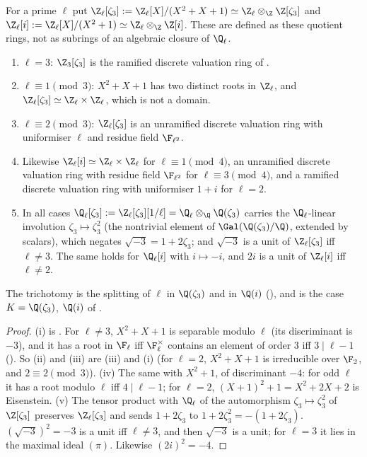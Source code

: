 \begin{proposition}\label{prop:ant:zlzeta3}
For a prime $\ell$ put $\Z_\ell[\zeta_3]:=\Z_\ell[X]/(X^2+X+1)\simeq\Z_\ell\otimes_\Z\Z[\zeta_3]$ and $\Z_\ell[i]:=\Z_\ell[X]/(X^2+1)\simeq\Z_\ell\otimes_\Z\Z[i]$. These are
defined as these quotient rings, not as subrings of an algebraic closure of $\Q_\ell$.
\begin{enumerate}[label=(\roman*)]
\item $\ell=3$: $\Z_3[\zeta_3]$ is the ramified discrete valuation ring of .
\item $\ell\equiv1\pmod3$: $X^2+X+1$ has two distinct roots in $\Z_\ell$, and $\Z_\ell[\zeta_3]\simeq\Z_\ell\times\Z_\ell$, which is not a domain.
\item $\ell\equiv2\pmod3$: $\Z_\ell[\zeta_3]$ is an unramified discrete valuation ring with uniformiser $\ell$ and residue field $\F_{\ell^2}$.
\item Likewise $\Z_\ell[i]\simeq\Z_\ell\times\Z_\ell$ for $\ell\equiv1\pmod4$, an unramified discrete valuation ring with residue field $\F_{\ell^2}$ for
$\ell\equiv3\pmod4$, and a ramified discrete valuation ring with uniformiser $1+i$ for $\ell=2$.
\item In all cases $\Q_\ell[\zeta_3]:=\Z_\ell[\zeta_3][1/\ell]=\Q_\ell\otimes_\Q\Q(\zeta_3)$ carries the $\Q_\ell$-linear involution $\zeta_3\mapsto\zeta_3^2$ (the
nontrivial element of $\Gal(\Q(\zeta_3)/\Q)$, extended by scalars), which negates $\sqrt{-3}=1+2\zeta_3$; and $\sqrt{-3}$ is a unit of $\Z_\ell[\zeta_3]$ iff
$\ell\ne3$. The same holds for $\Q_\ell[i]$ with $i\mapsto-i$, and $2i$ is a unit of $\Z_\ell[i]$ iff $\ell\ne2$.
\end{enumerate}
The trichotomy is the splitting of $\ell$ in $\Q(\zeta_3)$ and in $\Q(i)$ (), and is the case $K=\Q(\zeta_3)$, $\Q(i)$ of
.
\end{proposition}

\begin{proof}
(i) is . For $\ell\ne3$, $X^2+X+1$ is separable modulo $\ell$ (its discriminant is $-3$), and it has a root in $\F_\ell$ iff $\F_\ell^\times$
contains an element of order $3$ iff $3\mid\ell-1$ (). So (ii) and (iii) are (iii) and (i) (for $\ell=2$,
$X^2+X+1$ is irreducible over $\F_2$, and $2\equiv2\pmod 3$). (iv) The same with $X^2+1$, of discriminant $-4$: for odd $\ell$ it has a root modulo $\ell$
iff $4\mid\ell-1$; for $\ell=2$, $(X+1)^2+1=X^2+2X+2$ is Eisenstein. (v) The tensor product with $\Q_\ell$ of the automorphism $\zeta_3\mapsto\zeta_3^2$ of
$\Z[\zeta_3]$ preserves $\Z_\ell[\zeta_3]$ and sends $1+2\zeta_3$ to $1+2\zeta_3^2=-(1+2\zeta_3)$. $(\sqrt{-3})^2=-3$ is a unit iff $\ell\ne3$, and then
$\sqrt{-3}$ is a unit; for $\ell=3$ it lies in the maximal ideal $(\pi)$. Likewise $(2i)^2=-4$.
\end{proof}

